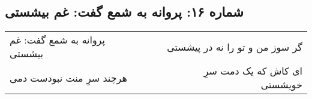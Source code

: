 \begin{center}
\section*{شماره ۱۶: پروانه به شمع گفت: غم بیشستی}
\label{sec:016}
\begin{longtable}{l p{0.5cm} r}
پروانه به شمع گفت: غم بیشستی
&&
گر سوز من و تو را نه در پیشستی
\\
هرچند سرِ منت نبودست دمی
&&
ای کاش که یک دمت سرِ خویشستی
\\
\end{longtable}
\end{center}

